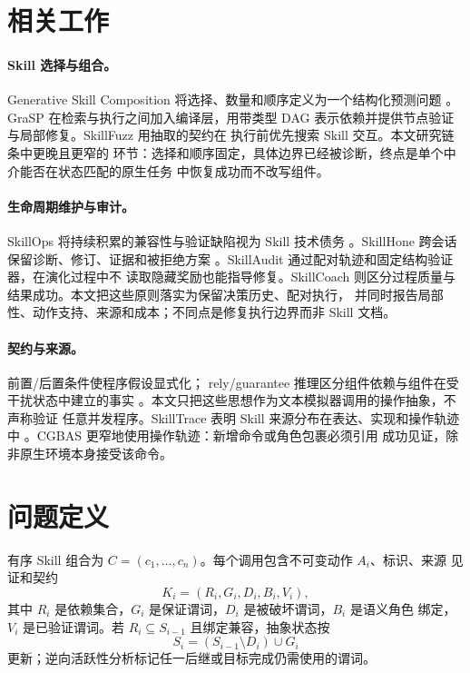 \documentclass[10pt]{article}
\begin{document}
\section{相关工作}

\paragraph{Skill 选择与组合。}
Generative Skill Composition 将选择、数量和顺序定义为一个结构化预测问题
\citep{zhao2026skillcomposer}。GraSP 在检索与执行之间加入编译层，用带类型 DAG
表示依赖并提供节点验证与局部修复\citep{xia2026grasp}。SkillFuzz 用抽取的契约在
执行前优先搜索 Skill 交互\citep{hu2026skillfuzz}。本文研究链条中更晚且更窄的
环节：选择和顺序固定，具体边界已经被诊断，终点是单个中介能否在状态匹配的原生任务
中恢复成功而不改写组件。

\paragraph{生命周期维护与审计。}
SkillOps 将持续积累的兼容性与验证缺陷视为 Skill 技术债务
\citep{pu2026skillops}。SkillHone 跨会话保留诊断、修订、证据和被拒绝方案
\citep{li2026skillhone}。SkillAudit 通过配对轨迹和固定结构验证器，在演化过程中不
读取隐藏奖励也能指导修复\citep{gao2026skillaudit}。SkillCoach 则区分过程质量与
结果成功\citep{zhu2026skillcoach}。本文把这些原则落实为保留决策历史、配对执行，
并同时报告局部性、动作支持、来源和成本；不同点是修复执行边界而非 Skill 文档。

\paragraph{契约与来源。}
前置/后置条件使程序假设显式化\citep{hoare1969axiomatic,meyer1992contract}；
rely/guarantee 推理区分组件依赖与组件在受干扰状态中建立的事实
\citep{jones1983rely}。本文只把这些思想作为文本模拟器调用的操作抽象，不声称验证
任意并发程序。SkillTrace 表明 Skill 来源分布在表达、实现和操作轨迹中
\citep{chen2026multitrace}。CGBAS 更窄地使用操作轨迹：新增命令或角色包裹必须引用
成功见证，除非原生环境本身接受该命令。

\section{问题定义}

有序 Skill 组合为 $C=(c_1,\ldots,c_n)$。每个调用包含不可变动作 $A_i$、标识、来源
见证和契约
\begin{equation}
K_i=(R_i,G_i,D_i,B_i,V_i),
\end{equation}
其中 $R_i$ 是依赖集合，$G_i$ 是保证谓词，$D_i$ 是被破坏谓词，$B_i$ 是语义角色
绑定，$V_i$ 是已验证谓词。若 $R_i\subseteq S_{i-1}$ 且绑定兼容，抽象状态按
\begin{equation}
S_i=(S_{i-1}\setminus D_i)\cup G_i
\end{equation}
更新；逆向活跃性分析标记任一后继或目标完成仍需使用的谓词。
\end{document}
